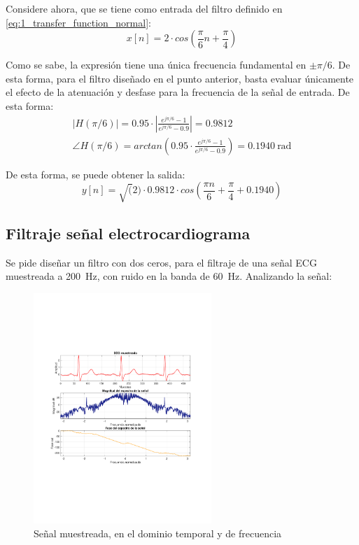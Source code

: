 		 Considere ahora, que se tiene como entrada del filtro definido en \ref{eq:1_transfer_function_normal}:
		 \begin{equation*}
		 	x[n] = 2 \cdot cos \left( \frac{\pi}{6}n + \frac{\pi}{4} \right)
		 \end{equation*}
		 
		Como se sabe, la expresión tiene una única frecuencia fundamental en $\pm \pi/6$. De esta forma, para el filtro diseñado en el punto anterior, basta evaluar únicamente el efecto de la atenuación y desfase para la frecuencia de la señal de entrada. De esta forma:
		\begin{align}
			|H(\pi/6)| = 0.95 \cdot \left| \frac{e^{j\pi/6} - 1}{e^{j\pi/6} - 0.9} \right| = 0.9812 \\
			\angle H(\pi/6) = arctan\left( 0.95 \cdot \frac{e^{j\pi/6} - 1}{e^{j\pi/6} - 0.9} \right) = 0.1940~\text{rad} 
		\end{align}
		
		De esta forma, se puede obtener la salida:
		\begin{equation}
			y[n] = \sqrt(2) \cdot 0.9812 \cdot cos \left( \frac{\pi n}{6} + \frac{\pi}{4} + 0.1940 \right)
		\end{equation}
		
	\subsection{Filtraje señal electrocardiograma}
		Se pide diseñar un filtro con dos ceros, para el filtraje de una señal ECG muestreada a 200~Hz, con ruido en la banda de 60~Hz. Analizando la señal:
		\begin{figure}[H]
			\center
			\includegraphics[width=0.6\textwidth,clip, trim = {1.9cm 6.8cm 2.3cm 7cm}]{../plots/ecg_time_freq.pdf}
			\caption{Señal muestreada, en el dominio temporal y de frecuencia}
			\label{fig:ecg_time_freq}
		\end{figure}		
				
